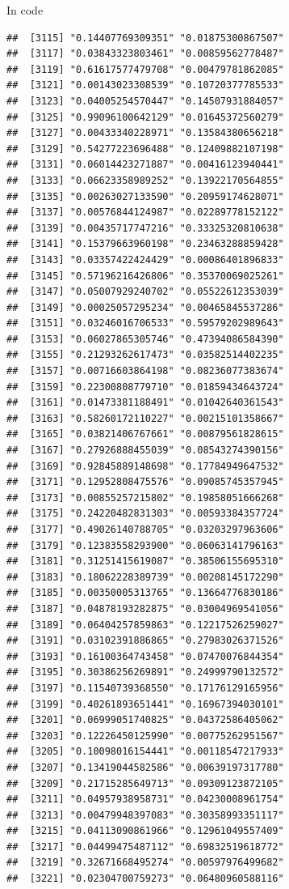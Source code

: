 \documentclass[ignorenonframetext,]{beamer}
\begin{document}
\begin{frame}[fragile]{In code}
\begin{verbatim}
##  [3115] "0.14407769309351" "0.01875300867507"
##  [3117] "0.03843323803461" "0.00859562778487"
##  [3119] "0.61617577479708" "0.00479781862085"
##  [3121] "0.00143023308539" "0.10720377785533"
##  [3123] "0.04005254570447" "0.14507931884057"
##  [3125] "0.99096100642129" "0.01645372560279"
##  [3127] "0.00433340228971" "0.13584380656218"
##  [3129] "0.54277223696488" "0.12409882107198"
##  [3131] "0.06014423271887" "0.00416123940441"
##  [3133] "0.06623358989252" "0.13922170564855"
##  [3135] "0.00263027133590" "0.20959174628071"
##  [3137] "0.00576844124987" "0.02289778152122"
##  [3139] "0.00435717747216" "0.33325320810638"
##  [3141] "0.15379663960198" "0.23463288859428"
##  [3143] "0.03357422424429" "0.00086401896833"
##  [3145] "0.57196216426806" "0.35370069025261"
##  [3147] "0.05007929240702" "0.05522612353039"
##  [3149] "0.00025057295234" "0.00465845537286"
##  [3151] "0.03246016706533" "0.59579202989643"
##  [3153] "0.06027865305746" "0.47394086584390"
##  [3155] "0.21293262617473" "0.03582514402235"
##  [3157] "0.00716603864198" "0.08236077383674"
##  [3159] "0.22300808779710" "0.01859434643724"
##  [3161] "0.01473381188491" "0.01042640361543"
##  [3163] "0.58260172110227" "0.00215101358667"
##  [3165] "0.03821406767661" "0.00879561828615"
##  [3167] "0.27926888455039" "0.08543274390156"
##  [3169] "0.92845889148698" "0.17784949647532"
##  [3171] "0.12952808475576" "0.09085745357945"
##  [3173] "0.00855257215802" "0.19858051666268"
##  [3175] "0.24220482831303" "0.00593384357724"
##  [3177] "0.49026140788705" "0.03203297963606"
##  [3179] "0.12383558293900" "0.06063141796163"
##  [3181] "0.31251415619087" "0.38506155695310"
##  [3183] "0.18062228389739" "0.00208145172290"
##  [3185] "0.00350005313765" "0.13664776830186"
##  [3187] "0.04878193282875" "0.03004969541056"
##  [3189] "0.06404257859863" "0.12217526259027"
##  [3191] "0.03102391886865" "0.27983026371526"
##  [3193] "0.16100364743458" "0.07470076844354"
##  [3195] "0.30386256269891" "0.24999790132572"
##  [3197] "0.11540739368550" "0.17176129165956"
##  [3199] "0.40261893651441" "0.16967394030101"
##  [3201] "0.06999051740825" "0.04372586405062"
##  [3203] "0.12226450125990" "0.00775262951567"
##  [3205] "0.10098016154441" "0.00118547217933"
##  [3207] "0.13419044582586" "0.00639197317780"
##  [3209] "0.21715285649713" "0.09309123872105"
##  [3211] "0.04957938958731" "0.04230008961754"
##  [3213] "0.00479948397083" "0.30358993351117"
##  [3215] "0.04113090861966" "0.12961049557409"
##  [3217] "0.04499475487112" "0.69832519618772"
##  [3219] "0.32671668495274" "0.00597976499682"
##  [3221] "0.02304700759273" "0.06480960588116"

\end{verbatim}
\end{frame}
\end{document}

